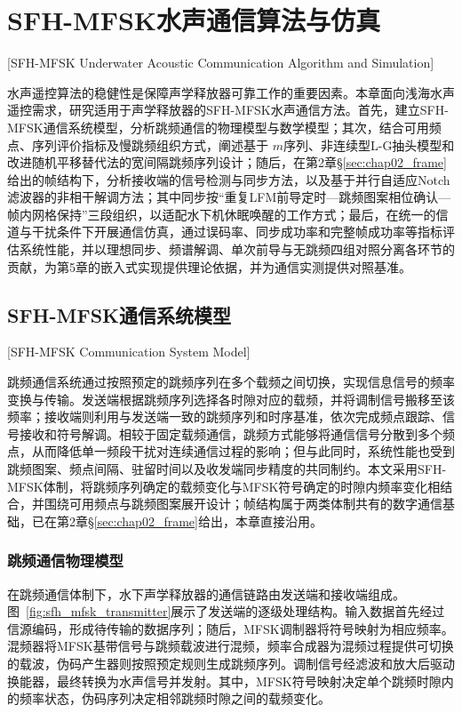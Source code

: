 
\chapter{SFH-MFSK水声通信算法与仿真}[SFH-MFSK Underwater Acoustic Communication Algorithm and Simulation]
\label{chap03}

水声遥控算法的稳健性是保障声学释放器可靠工作的重要因素。本章面向浅海水声遥控需求，研究适用于声学释放器的SFH-MFSK水声通信方法。首先，建立SFH-MFSK通信系统模型，分析跳频通信的物理模型与数学模型；其次，结合可用频点、序列评价指标及慢跳频组织方式，阐述基于
$m$序列、非连续型L-G抽头模型和改进随机平移替代法的宽间隔跳频序列设计；随后，在第2章\S\ref{sec:chap02_frame}给出的帧结构下，分析接收端的信号检测与同步方法，以及基于并行自适应Notch滤波器的非相干解调方法；其中同步按“重复LFM前导定时—跳频图案相位确认—帧内网格保持”三段组织，以适配水下机休眠唤醒的工作方式；最后，在统一的信道与干扰条件下开展通信仿真，通过误码率、同步成功率和完整帧成功率等指标评估系统性能，并以理想同步、频谱解调、单次前导与无跳频四组对照分离各环节的贡献，为第5章的嵌入式实现提供理论依据，并为通信实测提供对照基准。

\section{SFH-MFSK通信系统模型}[SFH-MFSK Communication System Model]

跳频通信系统通过按照预定的跳频序列在多个载频之间切换，实现信息信号的频率变换与传输。发送端根据跳频序列选择各时隙对应的载频，并将调制信号搬移至该频率；接收端则利用与发送端一致的跳频序列和时序基准，依次完成频点跟踪、信号接收和符号解调。相较于固定载频通信，跳频方式能够将通信信号分散到多个频点，从而降低单一频段干扰对连续通信过程的影响；但与此同时，系统性能也受到跳频图案、频点间隔、驻留时间以及收发端同步精度的共同制约。本文采用SFH-MFSK体制，将跳频序列确定的载频变化与MFSK符号确定的时隙内频率变化相结合，并围绕可用频点与跳频图案展开设计；帧结构属于两类体制共有的数字通信基础，已在第2章\S\ref{sec:chap02_frame}给出，本章直接沿用。

\subsection{跳频通信物理模型}

在跳频通信体制下，水下声学释放器的通信链路由发送端和接收端组成。图~\ref{fig:sfh_mfsk_transmitter}展示了发送端的逐级处理结构。输入数据首先经过信源编码，形成待传输的数据序列；随后，MFSK调制器将符号映射为相应频率。混频器将MFSK基带信号与跳频载波进行混频，频率合成器为混频过程提供可切换的载波，伪码产生器则按照预定规则生成跳频序列。调制信号经滤波和放大后驱动换能器，最终转换为水声信号并发射。其中，MFSK符号映射决定单个跳频时隙内的频率状态，伪码序列决定相邻跳频时隙之间的载频变化。

